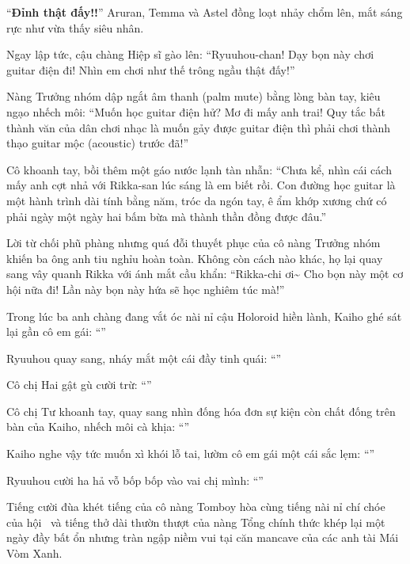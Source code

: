 \documentclass[../main.tex]{subfiles}
\begin{document}
``\textbf{Đỉnh thật đấy!!}'' Aruran, Temma và Astel đồng loạt nhảy chổm lên, mắt sáng rực như vừa thấy siêu nhân.

Ngay lập tức, cậu chàng Hiệp sĩ gào lên: ``Ryuuhou-chan! Dạy bọn này chơi guitar điện đi! Nhìn em chơi như thế trông ngầu thật đấy!''

Nàng Trưởng nhóm dập ngắt âm thanh (palm mute) bằng lòng bàn tay, kiêu ngạo nhếch môi: ``Muốn học guitar điện hử? Mơ đi mấy anh trai! Quy tắc bất thành văn của dân chơi nhạc là muốn gảy được guitar điện thì phải chơi thành thạo guitar mộc (acoustic) trước đã!''

Cô khoanh tay, bồi thêm một gáo nước lạnh tàn nhẫn: ``Chưa kể, nhìn cái cách mấy anh cợt nhả với Rikka-san lúc sáng là em biết rồi. Con đường học guitar là một hành trình dài tính bằng năm, tróc da ngón tay, ê ẩm khớp xương chứ có phải ngày một ngày hai bấm bừa mà thành thần đồng được đâu.''

Lời từ chối phũ phàng nhưng quá đỗi thuyết phục của cô nàng Trưởng nhóm khiến ba ông anh tiu nghỉu hoàn toàn. Không còn cách nào khác, họ lại quay sang vây quanh Rikka với ánh mắt cầu khẩn: ``Rikka-chi ơi\~{} Cho bọn này một cơ hội nữa đi! Lần này bọn này hứa sẽ học nghiêm túc mà!''

Trong lúc ba anh chàng đang vắt óc nài nỉ cậu Holoroid hiền lành, Kaiho ghé sát lại gần cô em gái: ``''

Ryuuhou quay sang, nháy mắt một cái đầy tinh quái: ``''

Cô chị Hai gật gù cười trừ: ``''

Cô chị Tư khoanh tay, quay sang nhìn đống hóa đơn sự kiện còn chất đống trên bàn của Kaiho, nhếch môi cà khịa: ``''

Kaiho nghe vậy tức muốn xì khói lỗ tai, lườm cô em gái một cái sắc lẹm: ``''

Ryuuhou cười ha hả vỗ bốp bốp vào vai chị mình: ``''

Tiếng cười đùa khét tiếng của cô nàng Tomboy hòa cùng tiếng nài nỉ chí chóe của hội \hls\ và tiếng thở dài thườn thượt của nàng Tổng chính thức khép lại một ngày đầy bất ổn nhưng tràn ngập niềm vui tại căn mancave của các anh tài Mái Vòm Xanh.
\end{document}

